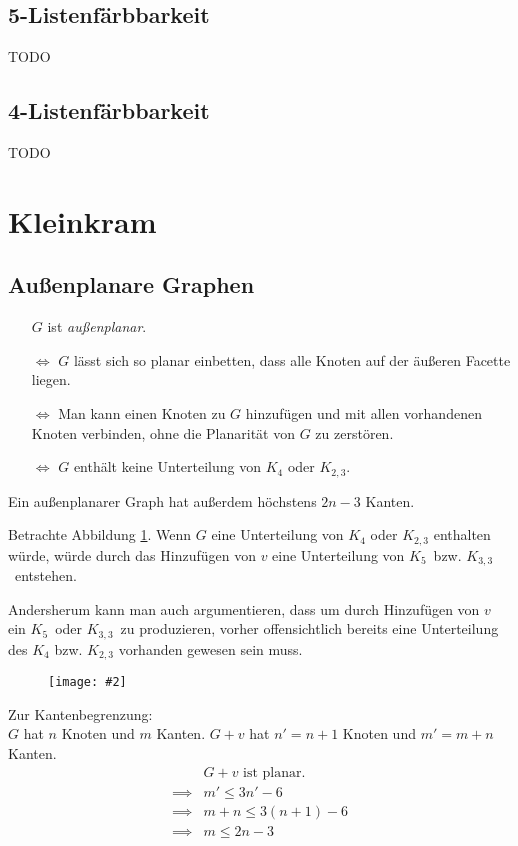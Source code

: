 \documentclass[10pt,a4paper]{article}
\makeatletter
\def\maxwidth#1{\ifdim\Gin@nat@width>#1 #1\else\Gin@nat@width\fi}
\newcommand{\imageFigure}[4]{%
    \begin{figure}[h]%
        \centering%
        {%
            \setlength{\fboxsep}{1pt}%
            \setlength{\fboxrule}{1pt}%
            \texttt{[image: \#2]}%
        }%
        \caption{#1}%
        \label{fig:#4}%
    \end{figure}%
}
\newcommand{\Kf}{$K_5$}
\newcommand{\Kdd}{$K_{3,3}$}
\makeatother
\begin{document}
\subsection{5-Listenfärbbarkeit}
TODO %
\subsection{4-Listenfärbbarkeit}
TODO %



\clearpage
\section{Kleinkram}
\subsection{Außenplanare Graphen}
\begin{itemize}
    \item[] $G$ ist \textit{außenplanar}.
    \item[$\iff$] $G$ lässt sich so planar einbetten, dass alle Knoten auf der
        äußeren Facette liegen.
    \item[$\iff$] Man kann einen Knoten zu $G$ hinzufügen und mit allen
        vorhandenen Knoten verbinden, ohne die Planarität von $G$ zu zerstören.
    \item[$\iff$] $G$ enthält keine Unterteilung von $K_4$ oder $K_{2,3}$.
\end{itemize}
Ein außenplanarer Graph hat außerdem höchstens $2n-3$ Kanten.

Betrachte Abbildung \ref{fig:outplane}.
Wenn $G$ eine Unterteilung von $K_4$ oder $K_{2,3}$ enthalten würde, würde
durch das Hinzufügen von $v$ eine Unterteilung von \Kf~bzw. \Kdd~entstehen.

Andersherum kann man auch argumentieren, dass um durch Hinzufügen von $v$ ein
\Kf~oder \Kdd~zu produzieren, vorher offensichtlich bereits eine Unterteilung
des $K_4$ bzw. $K_{2,3}$ vorhanden gewesen sein muss.

\imageFigure{}{outplane.png}{.4}{outplane}

Zur Kantenbegrenzung:\\
$G$ hat $n$ Knoten und $m$ Kanten.
$G+v$ hat $n'=n+1$ Knoten und $m'=m+n$ Kanten.
\begin{align*}
    &G+v \text{ ist planar.}\\
    \implies &m' \leq 3n'-6\\
    \implies &m+n \leq 3(n+1)-6\\
    \implies &m \leq 2n-3
\end{align*}
\end{document}
